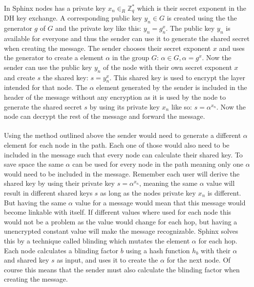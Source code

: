 \documentclass[informationsecurity]{gucmasterproject}
\begin{document}
\noindent In Sphinx \cite{danezis2009sphinx} nodes has a private key $x_{n} \in_R \mathbb{Z}_q^*$ which is their secret exponent in the DH key exchange. A corresponding public key $y_{n} \in G$ is created using the the generator $g$ of $G$ and the private key like this: $y_{n} = g^x_{n}$. The public key $y_{n}$ is available for everyone and thus the sender can use it to generate the shared secret when creating the message. The sender chooses their secret exponent $x$ and uses the generator to create a element $\alpha$ in the group $G$:
$\alpha \in G, \alpha = g^x$. Now the sender can use the public key $y_{n}$ of the node with their own secret exponent $x$ and create $s$ the shared key: $s = y_{n}^x$. This shared key is used to encrypt the layer intended for that node. The $\alpha$ element generated by the sender is included in the header of the message without any encryption as it is used by the node to generate the shared secret $s$ by using its private key $x_n$ like so: $s = \alpha^{x_n}$. Now the node can decrypt the rest of the message and forward the message.

\paragraph{}
Using the method outlined above the sender would need to generate a different $\alpha$ element for each node in the path.
Each one of those would also need to be included in the message such that every node can calculate their shared key.
To save space the same $\alpha$ can be used for every node in the path meaning only one $\alpha$ would need to be included in the message. Remember each user will derive the shared key by using their private key $s = \alpha^{x_n}$, meaning the same $\alpha$ value will result in different shared keys $s$ as long as the nodes private key $x_n$ is different. But having the same $\alpha$ value for a message would mean that this message would become linkable with itself. If different values where used for each node this would not be a problem as the value would change for each hop, but having a unencrypted constant value will make the message recognizable. Sphinx solves this by a technique called blinding which mutates the element $\alpha$ for each hop. Each node calculates a blinding factor $b$ using a hash function $h_b$ with their $\alpha$ and shared key $s$ as input, and uses it to create the $\alpha$ for the next node. Of course this means that the sender must also calculate the blinding factor when creating the message.
\end{document}
